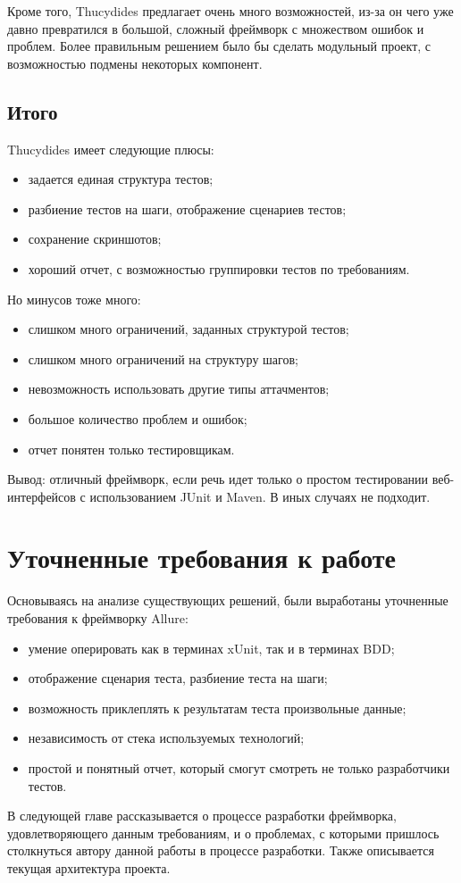 Кроме того, Thucydides предлагает очень много возможностей, из-за он чего уже давно превратился в большой, сложный фреймворк с множеством ошибок и проблем. Более правильным решением было бы сделать модульный проект, с возможностью подмены некоторых компонент.

\subsection{Итого} 

Thucydides имеет следующие плюсы: 
\begin{itemize}
\item задается единая структура тестов;
\item разбиение тестов на шаги, отображение сценариев тестов;
\item сохранение скриншотов;
\item хороший отчет, с возможностью группировки тестов по требованиям.
\end{itemize}

Но минусов тоже много:
\begin{itemize}
\item слишком много ограничений, заданных структурой тестов;
\item слишком много ограничений на структуру шагов;
\item невозможность использовать другие типы аттачментов;
\item большое количество проблем и ошибок;
\item отчет понятен только тестировщикам.
\end{itemize}

Вывод: отличный фреймворк, если речь идет только о простом тестировании веб-интерфейсов с использованием JUnit и Maven. В иных случаях не подходит.

\section{Уточненные требования к работе}

Основываясь на анализе существующих решений, были выработаны уточненные требования к фреймворку Allure:

\begin{itemize}
\item умение оперировать как в терминах xUnit, так и в терминах BDD;
\item отображение сценария теста, разбиение теста на шаги;
\item возможность приклеплять к результатам теста произвольные данные;
\item независимость от стека используемых технологий;
\item простой и понятный отчет, который смогут смотреть не только разработчики тестов.
\end{itemize}

В следующей главе рассказывается о процессе разработки фреймворка, удовлетворяющего данным требованиям, и о проблемах, с которыми пришлось столкнуться автору данной работы в процессе разработки. Также описывается текущая архитектура проекта.